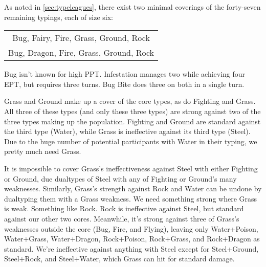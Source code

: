 As noted in \autoref{sec:typeleagues}, there exist two minimal coverings of the forty-seven
  remaining typings, each of size six:
\begin{center}
\begin{tabular}{c}
 Bug, Fairy, Fire, Grass, Ground, Rock\\
 Bug, Dragon, Fire, Grass, Ground, Rock\\
\end{tabular}
\end{center}
Bug isn't known for high PPT\@. Infestation manages two while achieving four EPT,
 but requires three turns. Bug Bite does three on both in a single turn.

Grass and Ground make up a cover of the core types, as do Fighting and Grass.
All three of these types (and only these three types) are strong against two of the three
  types making up the population.
Fighting and Ground are standard against the third type (Water), while Grass is ineffective
  against its third type (Steel).
Due to the huge number of potential participants with Water in their typing, we pretty
  much need Grass.

It is impossible to cover Grass's ineffectiveness against Steel with either Fighting or Ground,
  due dualtypes of Steel with any of Fighting or Ground's many weaknesses.
Similarly, Grass's strength against Rock and Water can be undone by dualtyping them with a Grass weakness.
We need something strong where Grass is weak.
Something like Rock.
Rock is ineffective against Steel, but standard against our other two cores.
Meanwhile, it's strong against three of Grass's weaknesses outside the core (Bug, Fire, and Flying),
  leaving only Water+Poison, Water+Grass, Water+Dragon, Rock+Poison, Rock+Grass, and Rock+Dragon
  as standard.
We're ineffective against anything with Steel except for Steel+Ground, Steel+Rock, and Steel+Water, which
  Grass can hit for standard damage.

